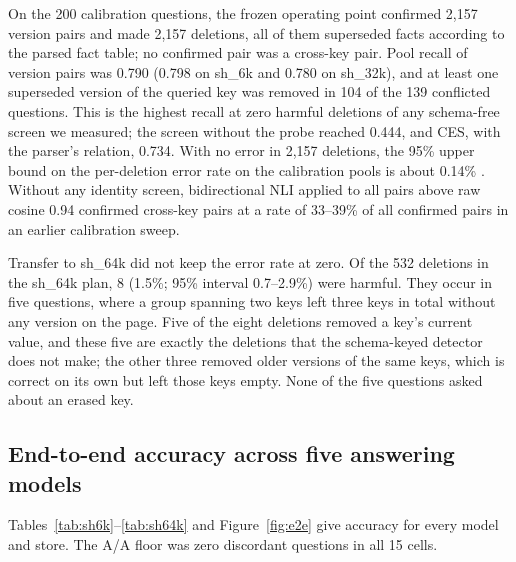 \documentclass[11pt]{article}
\newcommand{\sub}[1]{\textsf{sh\_#1}}                    %
\begin{document}
On the 200 calibration questions, the frozen operating point confirmed 2,157 version pairs and made 2,157 deletions, all of them superseded facts according to the parsed fact table; no confirmed pair was a cross-key pair. Pool recall of version pairs was 0.790 (0.798 on \sub{6k} and 0.780 on \sub{32k}), and at least one superseded version of the queried key was removed in 104 of the 139 conflicted questions. This is the highest recall at zero harmful deletions of any schema-free screen we measured; the screen without the probe reached 0.444, and CES, with the parser's relation, 0.734. With no error in 2,157 deletions, the 95\% upper bound on the per-deletion error rate on the calibration pools is about 0.14\% \cite{hanley1983zero}. Without any identity screen, bidirectional NLI applied to all pairs above raw cosine 0.94 confirmed cross-key pairs at a rate of 33--39\% of all confirmed pairs in an earlier calibration sweep.

Transfer to \sub{64k} did not keep the error rate at zero. Of the 532 deletions in the \sub{64k} plan, 8 (1.5\%; 95\% interval 0.7--2.9\%) were harmful. They occur in five questions, where a group spanning two keys left three keys in total without any version on the page. Five of the eight deletions removed a key's current value, and these five are exactly the deletions that the schema-keyed detector does not make; the other three removed older versions of the same keys, which is correct on its own but left those keys empty. None of the five questions asked about an erased key.

\subsection{End-to-end accuracy across five answering models}
\label{sec:e2e}

Tables~\ref{tab:sh6k}--\ref{tab:sh64k} and Figure~\ref{fig:e2e} give accuracy for every model and store. The A/A floor was zero discordant questions in all 15 cells.
\end{document}
